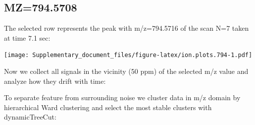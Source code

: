 \documentclass[]{article}
\newenvironment{Shaded}{\begin{snugshade}}{\end{snugshade}}
\newcommand{\KeywordTok}[1]{\textcolor[rgb]{0.13,0.29,0.53}{\textbf{#1}}}
\newcommand{\FloatTok}[1]{\textcolor[rgb]{0.00,0.00,0.81}{#1}}
\newcommand{\StringTok}[1]{\textcolor[rgb]{0.31,0.60,0.02}{#1}}
\newcommand{\OperatorTok}[1]{\textcolor[rgb]{0.81,0.36,0.00}{\textbf{#1}}}
\newcommand{\NormalTok}[1]{#1}
\begin{document}
\subsection{MZ=794.5708}\label{mz794.5708}

\begin{Shaded}
\end{Shaded}

The selected row represents the peak with m/z=794.5716 of the scan N=7
taken at time 7.1 sec:

\begin{Shaded}
\end{Shaded}

\texttt{[image: Supplementary\_document\_files/figure-latex/ion.plots.794-1.pdf]}

Now we collect all signals in the vicinity (50 ppm) of the selected m/z
value and analyze how they drift with time:

\begin{Shaded}
\end{Shaded}

To separate feature from surrounding noise we cluster data in m/z domain
by hierarchical Ward clustering and select the most stable clusters with
dynamicTreeCut:
\end{document}
